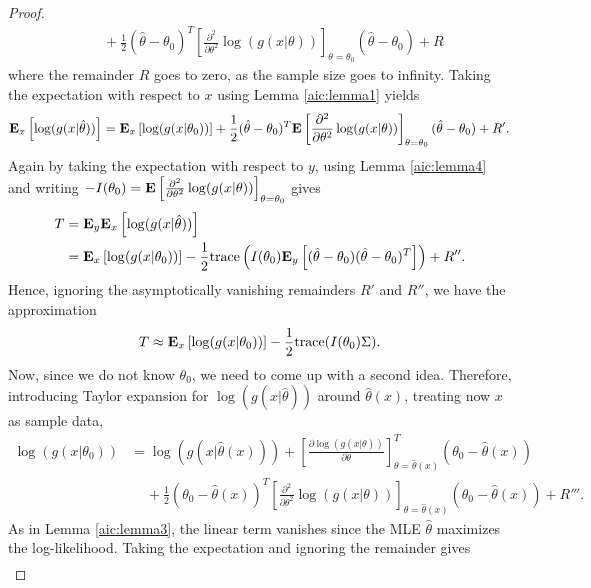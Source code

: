\documentclass[a4paper, 11pt]{scrreprt}
\newcommand{\trace}{{\mathrm{trace}}}
\newcommand{\ew}{\mbox{\textbf{E}}}
\begin{document}
\begin{proof}
\begin{align*}
 &\phantom{....} + \frac{1}{2}(\hat{\theta} - \theta_0)^T \left[ \frac{\partial^2}{\partial \theta^2} \log(g(x|\theta)) \right]_{\theta = \theta_0}  (\hat{\theta} - \theta_0) + R
\end{align*}
where the remainder $R$ goes to zero, as the sample size goes to infinity.
Taking the expectation with respect to $x$ using Lemma \ref{aic:lemma1} yields
\begin{align*}
\ew_x \left[\log(g(x|\hat{\theta})) \right]
= \ew_x \left[ \log(g(x|\theta_0)) \right] + \frac{1}{2}(\hat{\theta} - \theta_0)^T \ew \left[ \frac{\partial^2}{\partial \theta^2} \log(g(x|\theta)) \right]_{\theta = \theta_0}  (\hat{\theta} - \theta_0) + R'.
\end{align*}
Again by taking the expectation with respect to $y$, using Lemma \ref{aic:lemma4} and writing $-I(\theta_0) =  \ew \left[ \frac{\partial^2}{\partial \theta^2} \log(g(x|\theta)) \right]_{\theta= \theta_0}$ gives
\begin{align*}
T &= \ew_y \ew_x \left[\log(g(x|\hat{\theta})) \right] \\
& = \ew_x \left[ \log(g(x|\theta_0)) \right] - \frac{1}{2} \trace \left( I(\theta_0) \ew_y \left[(\hat{\theta} - \theta_0)(\hat{\theta} - \theta_0)^T \right] \right) + R''.
\end{align*}
Hence, ignoring the asymptotically vanishing remainders $R'$ and $R''$, we have the approximation
\begin{equation}\label{aic:eq}
T \approx \ew_x \left[ \log(g(x|\theta_0)) \right] - \frac{1}{2} \trace(I(\theta_0) \Sigma).
\end{equation}
Now, since we do not know $\theta_0$, we need to come up with a second idea. Therefore, introducing Taylor expansion for $\log(g(x|\hat{\theta}))$ around $\hat{\theta}(x)$, treating now $x$ as sample data,
\begin{align*}
\log(g(x|\theta_0)) 
&= \log(g(x|\hat{\theta}(x))) + \left[ \frac{\partial \log(g(x|\theta))}{\partial \theta} \right]_{\theta = \hat{\theta}(x)}^T (\theta_0 - \hat{\theta}(x)) \\
&\phantom{....} + \frac{1}{2}(\theta_0 - \hat{\theta}(x))^T \left[ \frac{\partial^2}{\partial \theta^2} \log(g(x|\theta)) \right]_{\theta= \hat{\theta}(x) }  (\theta_0 - \hat{\theta}(x)) + R'''.
\end{align*}
As in Lemma \ref{aic:lemma3}, the linear term vanishes since the MLE $\hat{\theta}$ maximizes the log-likelihood.
Taking the expectation and ignoring the remainder gives
\begin{align}

\end{align}
\end{proof}
\end{document}

